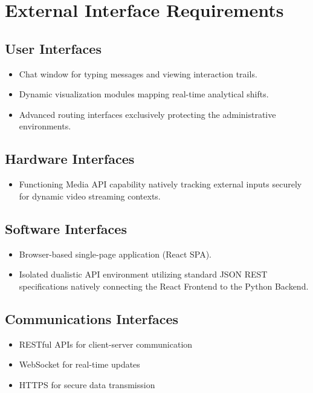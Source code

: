 \documentclass[11pt]{report}
\begin{document}
\section{External Interface Requirements}

\subsection{User Interfaces}
\begin{itemize}
    \item Chat window for typing messages and viewing interaction trails.
    \item Dynamic visualization modules mapping real-time analytical shifts.
    \item Advanced routing interfaces exclusively protecting the administrative environments.
\end{itemize}

\subsection{Hardware Interfaces}
\begin{itemize}
    \item Functioning Media API capability natively tracking external inputs securely for dynamic video streaming contexts.
\end{itemize}

\subsection{Software Interfaces}
\begin{itemize}
    \item Browser-based single-page application (React SPA).
    \item Isolated dualistic API environment utilizing standard JSON REST specifications natively connecting the React Frontend to the Python Backend.
\end{itemize}

\subsection{Communications Interfaces}
\begin{itemize}
    \item RESTful APIs for client-server communication
    \item WebSocket for real-time updates
    \item HTTPS for secure data transmission
\end{itemize}
\end{document}
